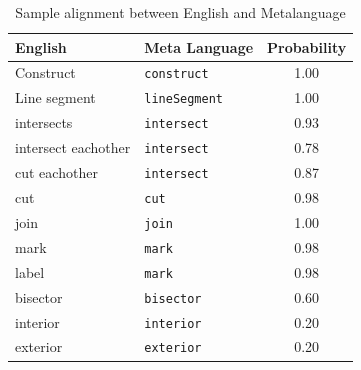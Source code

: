 \def\DevnagVersion{2.15}\documentclass[12pt]{article}
\begin{document}
\begin{table}[H]
\smallskip
\begin{center}
\begin{tabular}{p{}p{}c}
\hline
\bf{English} & \bf{Meta Language} & \bf{Probability}\\[0.2cm]\hline
Construct & \texttt{construct} & 1.00\\
Line segment & \texttt{lineSegment} & 1.00\\
intersects & \texttt{intersect} & 0.93\\
intersect eachother & \texttt{intersect} & 0.78\\
cut eachother & \texttt{intersect} & 0.87\\
cut & \texttt{cut} & 0.98\\
join & \texttt{join} & 1.00\\
mark & \texttt{mark} & 0.98\\
label & \texttt{mark} & 0.98\\
bisector & \texttt{bisector} & 0.60\\
interior & \texttt{interior} & 0.20\\
exterior & \texttt{exterior} & 0.20\\
\hline
\end{tabular}
\caption{Sample alignment between English and Metalanguage}
\end{center}
\end{table}
\end{document}
